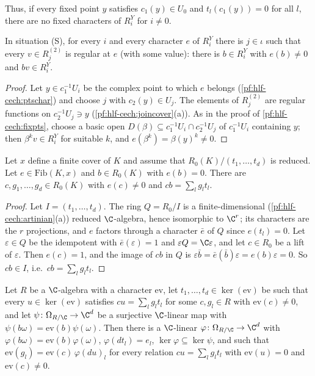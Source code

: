 Thus, if every fixed point $y$ satisfies $c_1(y)\in U_0$ and $t_l(c_1(y))=0$ for all $l$, there are no fixed characters of $R^Y_i$ for $i\ne0$.

\begin{proposition}\label{pf:hlf-cech:sections}
In situation (S), for every $i$ and every character $e$ of $R^Y_i$ there is $j\in\iota$ such that every $v\in R^{(2)}_j$ is regular at $e$ (with some
value): there is $b\in R^Y_i$ with $e(b)\ne0$ and $bv\in R^Y_i$.
\end{proposition}

\begin{proof}
Let $y\in c_1^{-1}U_i$ be the complex point to which $e$ belongs (\cref{pf:hlf-cech:ptschar}) and choose $j$ with $c_2(y)\in U_j$. The elements of
$R^{(2)}_j$ are regular functions on $c_2^{-1}U_j\ni y$ (\cref{pf:hlf-cech:joincover}(a)). As in the proof of \cref{pf:hlf-cech:fixpts}, choose a basic open
$D(\beta)\subseteq c_1^{-1}U_i\cap c_2^{-1}U_j$ of $c_1^{-1}U_i$ containing $y$; then $\beta^kv\in R^Y_i$ for suitable $k$, and $e(\beta^k)=\beta(y)^k\ne0$.
\end{proof}

\begin{proposition}\label{pf:hlf-cech:regpar}
Let $x$ define a finite cover of $K$ and assume that $R_0(K)/(t_1,\dots,t_d)$ is reduced. Let $e\in\mathrm{Fib}(K,x)$ and $b\in R_0(K)$ with $e(b)=0$.
There are $c,g_1,\dots,g_d\in R_0(K)$ with $e(c)\ne0$ and $cb=\sum_lg_lt_l$.
\end{proposition}

\begin{proof}
Let $I=(t_1,\dots,t_d)$. The ring $Q=R_0/I$ is a finite-dimensional (\cref{pf:hlf-cech:artinian}(a)) reduced $\C$-algebra, hence isomorphic to
$\C^r$; its characters are the $r$ projections, and $e$ factors through a character $\bar e$ of $Q$ since $e(t_l)=0$. Let $\varepsilon\in Q$ be the
idempotent with $\bar e(\varepsilon)=1$ and $\varepsilon Q=\C\varepsilon$, and let $c\in R_0$ be a lift of $\varepsilon$. Then $e(c)=1$, and the image of $cb$
in $Q$ is $\varepsilon\bar b=\bar e(\bar b)\varepsilon=e(b)\varepsilon=0$. So $cb\in I$, i.e.\ $cb=\sum_lg_lt_l$.
\end{proof}

\begin{lemma}\label{pf:hlf-cech:dualbasis}
Let $R$ be a $\C$-algebra with a character $\mathrm{ev}$, let $t_1,\dots,t_d\in\ker(\mathrm{ev})$ be such that every $u\in\ker(\mathrm{ev})$ satisfies
$cu=\sum_lg_lt_l$ for some $c,g_l\in R$ with $\mathrm{ev}(c)\ne0$, and let $\psi\colon\Omega_{R/\C}\to\C^d$ be a surjective $\C$-linear map with
$\psi(b\omega)=\mathrm{ev}(b)\psi(\omega)$. Then there is a $\C$-linear $\varphi\colon\Omega_{R/\C}\to\C^d$ with $\varphi(b\omega)=\mathrm{ev}(b)\varphi(\omega)$,
$\varphi(dt_l)=e_l$, $\ker\varphi\subseteq\ker\psi$, and such that $\mathrm{ev}(g_l)=\mathrm{ev}(c)\,\varphi(du)_l$ for every relation $cu=\sum_lg_lt_l$
with $\mathrm{ev}(u)=0$ and $\mathrm{ev}(c)\ne0$.
\end{lemma}


